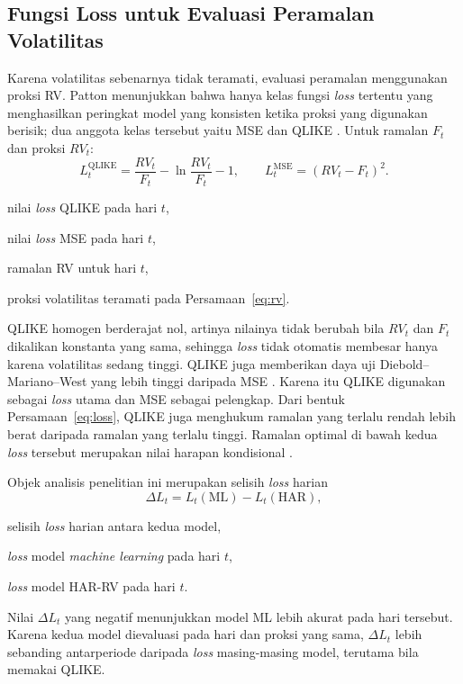 \subsection{Fungsi Loss untuk Evaluasi Peramalan Volatilitas}
Karena volatilitas sebenarnya tidak teramati, evaluasi peramalan menggunakan
proksi RV. Patton menunjukkan bahwa hanya kelas fungsi \textit{loss} tertentu
yang menghasilkan peringkat model yang konsisten ketika proksi yang digunakan
berisik; dua anggota kelas tersebut yaitu MSE dan QLIKE \cite{patton2011}.
Untuk ramalan $F_t$ dan proksi $RV_t$:
\begin{equation}
  L^{\text{QLIKE}}_t = \frac{RV_t}{F_t} - \ln\frac{RV_t}{F_t} - 1,
  \qquad
  L^{\text{MSE}}_t = (RV_t - F_t)^2.
  \label{eq:loss}
\end{equation}
\begin{keterangan}
  \item[$L^{\text{QLIKE}}_t$] nilai \textit{loss} QLIKE pada hari $t$,
  \item[$L^{\text{MSE}}_t$] nilai \textit{loss} MSE pada hari $t$,
  \item[$F_t$] ramalan RV untuk hari $t$,
  \item[$RV_t$] proksi volatilitas teramati pada Persamaan~\ref{eq:rv}.
\end{keterangan}
QLIKE homogen berderajat nol, artinya nilainya tidak berubah bila $RV_t$ dan
$F_t$ dikalikan konstanta yang sama, sehingga \textit{loss} tidak otomatis
membesar hanya karena volatilitas sedang tinggi. QLIKE juga memberikan daya uji
Diebold--Mariano--West yang lebih tinggi daripada MSE \cite{patton2011}.
Karena itu QLIKE digunakan sebagai \textit{loss} utama dan MSE sebagai
pelengkap. Dari bentuk Persamaan~\eqref{eq:loss}, QLIKE juga menghukum
ramalan yang terlalu rendah lebih berat daripada ramalan yang terlalu tinggi.
Ramalan optimal di bawah kedua \textit{loss} tersebut merupakan nilai harapan
kondisional \cite{patton2011}.

Objek analisis penelitian ini merupakan selisih \textit{loss} harian
\begin{equation}
  \Delta L_t = L_t(\text{ML}) - L_t(\text{HAR}),
  \label{eq:delta-loss}
\end{equation}
\begin{keterangan}
  \item[$\Delta L_t$] selisih \textit{loss} harian antara kedua model,
  \item[$L_t(\text{ML})$] \textit{loss} model \textit{machine learning}
    pada hari $t$,
  \item[$L_t(\text{HAR})$] \textit{loss} model HAR-RV pada hari $t$.
\end{keterangan}
Nilai $\Delta L_t$ yang negatif menunjukkan model ML lebih akurat pada hari
tersebut.
Karena kedua model dievaluasi pada hari dan proksi yang sama, $\Delta L_t$
lebih sebanding antarperiode daripada \textit{loss} masing-masing model,
terutama bila memakai QLIKE.


